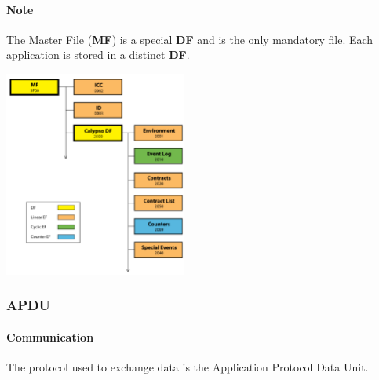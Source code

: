 \paragraph{Note} The Master File (\textbf{MF}) is a special \textbf{DF}
and is the only mandatory file. Each application is stored in a distinct
\textbf{DF}.

\begin{center}
    \includegraphics[width=6cm]{img/7816}
\end{center}

\subsubsection{APDU}


\paragraph{Communication}
The protocol used to exchange data is the Application Protocol Data Unit.


